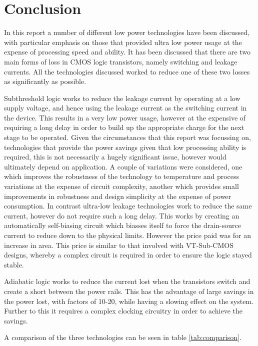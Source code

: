 \section{Conclusion}

In this report a number of different low power technologies have been discussed, with particular emphasis on those that provided ultra low power usage at the expense of processing speed and ability.
It has been discussed that there are two main forms of loss in CMOS logic transistors, namely switching and leakage currents.
All the technologies discussed worked to reduce one of these two losses as significantly as possible. 

Subthreshold logic works to reduce the leakage current by operating at a low supply voltage, and hence using the leakage current as the switching current in the device.
This results in a very low power usage, however at the expensive of requiring a long delay in order to build up the appropriate charge for the next stage to be operated.
Given the circumstances that this report was focussing on, technologies that provide the power savings given that low processing ability is required, this is not necessarily a hugely significant issue, however would ultimately depend on application.
A couple of variations were considered, one which improves the robustness of the technology to temperature and process variations at the expense of circuit complexity, another which provides small improvements in robustness and design simplicity at the expense of power consumption.
In contrast ultra-low leakage technologies work to reduce the same current, however do not require such a long delay.
This works by creating an automatically self-biasing circuit which biasses itself to force the drain-source current to reduce down to the physical limits.
However the price paid was for an increase in area.
This price is similar to that involved with VT-Sub-CMOS designs, whereby a complex circuit is required in order to ensure the logic stayed stable.

Adiabatic logic works to reduce the current lost when the transistors switch and create a short between the power rails.
This has the advantage of large savings in the power lost, with factors of 10-20, while having a slowing effect on the system.
Further to this it requires a complex clocking circuitry in order to achieve the savings.

A comparison of the three technologies can be seen in table \ref{tab:comparison}.

